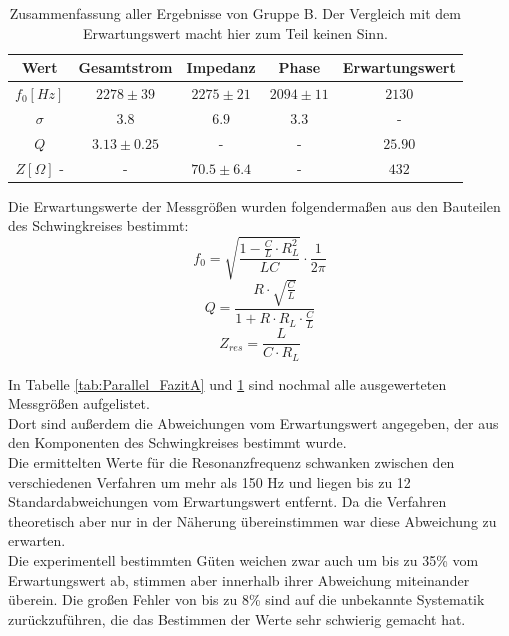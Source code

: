 \documentclass[12pt,a4paper]{article}
\begin{document}
\begin{table}[h]
\centering
\begin{tabular}{|c|c|c|c|c|}
\hline
Wert & Gesamtstrom & Impedanz & Phase & Erwartungswert\\
\hline
\hline
$f_0[Hz]$ & $2278\pm 39$ & $2275\pm 21$ & $2094\pm 11$ & $2130$\\
\hline
$\sigma$ & $3.8$ & $6.9$ & $3.3$ & -\\
\hline
\hline
$Q$ & $3.13\pm 0.25$ &  - & - & $25.90$\\
\hline
\hline
$Z[\Omega]$ - & - & $70.5\pm 6.4$ &  - &$432$\\
\hline
\end{tabular}
\caption{Zusammenfassung aller Ergebnisse von Gruppe B. Der Vergleich mit dem Erwartungswert macht hier zum Teil keinen Sinn.}
\label{tab:Parallel_FazitB}
\end{table}

Die Erwartungswerte der Messgrößen wurden folgendermaßen aus den Bauteilen des Schwingkreises bestimmt:
\begin{equation}
f_0 = \sqrt{\dfrac{1-\frac{C}{L}\cdot R_L^{2}}{LC}}\cdot \dfrac{1}{2\pi}
\end{equation}
\begin{equation}
Q = \dfrac{R\cdot \sqrt{\frac{C}{L}}}{1+R\cdot R_L\cdot \frac{C}{L}}
\end{equation}
\begin{equation}
Z_{res} = \dfrac{L}{C\cdot R_L}
\end{equation}

In Tabelle \ref{tab:Parallel_FazitA} und \ref{tab:Parallel_FazitB} sind nochmal alle ausgewerteten Messgrößen aufgelistet.\\
Dort sind außerdem die Abweichungen vom Erwartungswert angegeben, der aus den Komponenten des Schwingkreises bestimmt wurde.\\
Die ermittelten Werte für die Resonanzfrequenz schwanken zwischen den verschiedenen Verfahren um mehr als 150 Hz und liegen bis zu 12 Standardabweichungen vom Erwartungswert entfernt. Da die Verfahren theoretisch aber nur in der Näherung übereinstimmen war diese Abweichung zu erwarten.\\
Die experimentell bestimmten Güten weichen zwar auch um bis zu 35\% vom Erwartungswert ab, stimmen aber innerhalb ihrer Abweichung miteinander überein. Die großen Fehler von bis zu 8\% sind auf die unbekannte Systematik zurückzuführen, die das Bestimmen der Werte sehr schwierig gemacht hat.
\end{document}
